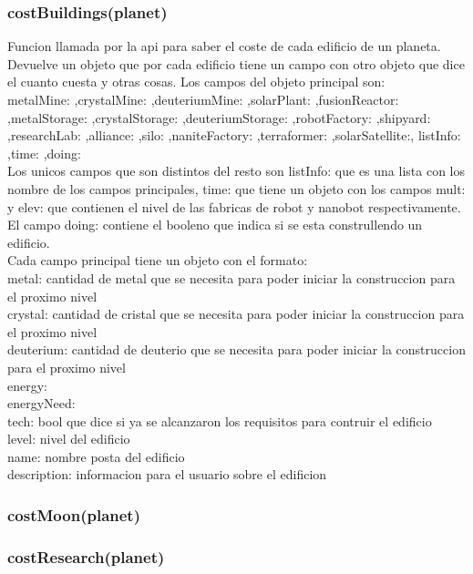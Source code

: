 \documentclass{article}
\newcommand\tab[1][1cm]{\hspace*{#1}}
\begin{document}
        \subsubsection{costBuildings(planet)}
          Funcion llamada por la api para saber el coste de cada edificio de un planeta. Devuelve un objeto que por cada edificio tiene un campo con otro objeto que dice el cuanto cuesta y otras cosas. Los campos del objeto principal son:\\
          metalMine: ,crystalMine: ,deuteriumMine: ,solarPlant: ,fusionReactor: ,metalStorage: ,crystalStorage: ,deuteriumStorage: ,robotFactory: ,shipyard: ,researchLab: ,alliance: ,silo: ,naniteFactory: ,terraformer: ,solarSatellite:, listInfo: ,time: ,doing:\\
          Los unicos campos que son distintos del resto son listInfo: que es una lista con los nombre de los campos principales, time: que tiene un objeto con los campos mult: y elev: que contienen el nivel de las fabricas de robot y nanobot respectivamente. El campo doing: contiene el booleno que indica si se esta construllendo un edificio.\\
          Cada campo principal tiene un objeto con el formato:\\
          \tab metal: cantidad de metal que se necesita para poder iniciar la construccion para el proximo nivel\\
          \tab crystal: cantidad de cristal que se necesita para poder iniciar la construccion para el proximo nivel\\
          \tab deuterium: cantidad de deuterio que se necesita para poder iniciar la construccion para el proximo nivel\\
          \tab energy: \\
          \tab energyNeed: \\
          \tab tech: bool que dice si ya se alcanzaron los requisitos para contruir el edificio\\
          \tab level: nivel del edificio\\
          \tab name: nombre posta del edificio\\
          \tab description: informacion para el usuario sobre el edificion\\
        \subsubsection{costMoon(planet)}
        \subsubsection{costResearch(planet)}
\end{document}
